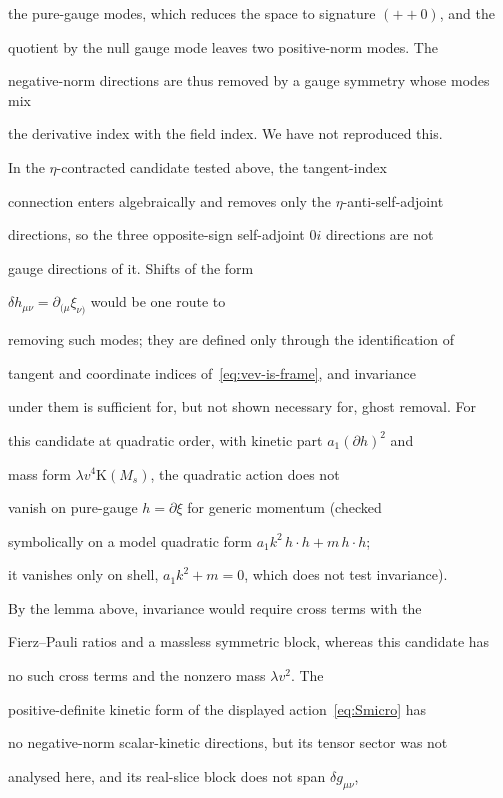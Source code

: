 the pure-gauge modes, which reduces the space to signature \((++0)\), and the

quotient by the null gauge mode leaves two positive-norm modes.  The

negative-norm directions are thus removed by a gauge symmetry whose modes mix

the derivative index with the field index.  We have not reproduced this.



In the \(\eta\)-contracted candidate tested above, the tangent-index

connection enters algebraically and removes only the \(\eta\)-anti-self-adjoint

directions, so the three opposite-sign self-adjoint \(0i\) directions are not

gauge directions of it.  Shifts of the form

\(\delta h_{\mu\nu}=\partial_{(\mu}\xi_{\nu)}\) would be one route to

removing such modes; they are defined only through the identification of

tangent and coordinate indices of~\eqref{eq:vev-is-frame}, and invariance

under them is sufficient for, but not shown necessary for, ghost removal.  For

this candidate at quadratic order, with kinetic part \(a_1(\partial h)^2\) and

mass form \(\lambda v^{4}\mathrm{K}(M_s)\), the quadratic action does not

vanish on pure-gauge \(h=\partial\xi\) for generic momentum (checked

symbolically on a model quadratic form \(a_1k^2\,h\!\cdot\!h+m\,h\!\cdot\!h\);

it vanishes only on shell, \(a_1k^2+m=0\), which does not test invariance).

By the lemma above, invariance would require cross terms with the

Fierz--Pauli ratios and a massless symmetric block, whereas this candidate has

no such cross terms and the nonzero mass \(\lambda v^2\).  The

positive-definite kinetic form of the displayed action~\eqref{eq:Smicro} has

no negative-norm scalar-kinetic directions, but its tensor sector was not

analysed here, and its real-slice block does not span \(\delta g_{\mu\nu}\),

